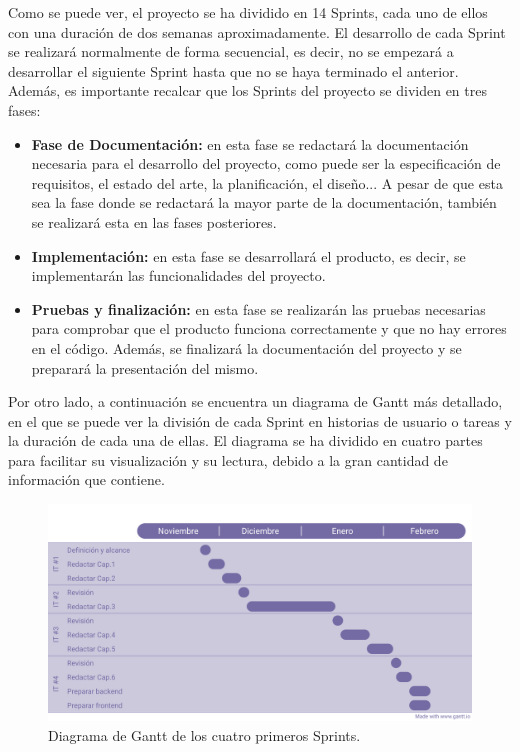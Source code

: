 Como se puede ver, el proyecto se ha dividido en 14 Sprints, cada uno de ellos con una duración de dos semanas aproximadamente.
El desarrollo de cada Sprint se realizará normalmente de forma secuencial, es decir, no se empezará a desarrollar el siguiente 
Sprint hasta que no se haya terminado el anterior.
Además, es importante recalcar que los Sprints del proyecto se dividen en tres fases:
\begin{itemize}
    \item \textbf{Fase de Documentación:} en esta fase se redactará la documentación necesaria para el desarrollo del proyecto, como puede ser la especificación de requisitos, el estado del arte, la planificación, el diseño...
    A pesar de que esta sea la fase donde se redactará la mayor parte de la documentación, también se realizará esta en las fases posteriores.
    \item \textbf{Implementación:} en esta fase se desarrollará el producto, es decir, se implementarán las funcionalidades del proyecto.
    \item \textbf{Pruebas y finalización:} en esta fase se realizarán las pruebas necesarias para comprobar que el producto funciona correctamente y que no hay errores en el código. Además, se finalizará la documentación del proyecto y se preparará la presentación del mismo.
\end{itemize}


Por otro lado, a continuación se encuentra un diagrama de Gantt más detallado, en el que se puede ver la división de 
cada Sprint en historias de usuario o tareas y la duración de cada una de ellas. El diagrama se ha dividido en cuatro partes
para facilitar su visualización y su lectura, debido a la gran cantidad de información que contiene.

\begin{figure}[H]
    \centering
    \centerline{\includegraphics[width=1\textwidth]{imagenes/c4/gantt1.png}}
    \caption{Diagrama de Gantt de los cuatro primeros Sprints.}
    \label{fig:diagrama_gantt1}
\end{figure}

